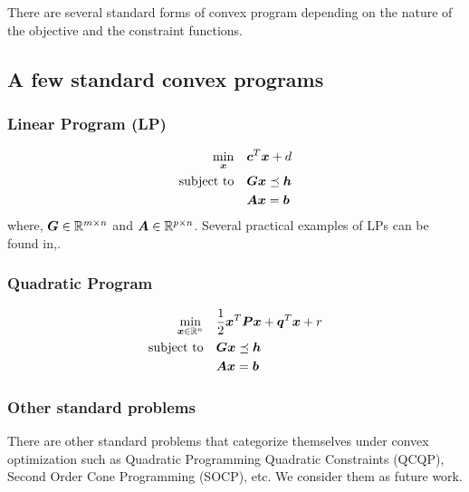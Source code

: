 \documentclass{article} %
\begin{document}
There are several standard forms of convex program depending on the nature of the objective and the constraint functions. 

\subsection{A few standard convex programs}
    \subsubsection{Linear Program (LP)}
        \begin{subequations}\label{eq:LP}
            \begin{align}
                \min_{{\bm{x}}} \quad &{\bm{c}}^T{\bm{x}} + d \\
                \text{subject to} \quad &{\bm{G}}{\bm{x}} \preceq {\bm{h}} \\
                \quad &{\bm{A}}{\bm{x}} = {\bm{b}}
            \end{align}
        \end{subequations}
        where, ${\bm{G}} \in \mathbb{R}^{m \times n}$ and ${\bm{A}} \in \mathbb{R}^{p \times n}$.
    Several practical examples of LPs can be found in,\cite{Boyd_Vandenberghe_2004}.

    \subsubsection{Quadratic Program}
        \begin{subequations}\label{eq:QP}
            \begin{align}
            \min_{{\bm{x}} \in \mathbb{R}^n} \quad &\frac{1}{2}{{\bm{x}}}^T {\bm{P}} {\bm{x}} + {\bm{q}}^T {\bm{x}} + r \\ 
            \text{subject to} \quad & {\bm{G}}{\bm{x}} \preceq {\bm{h}}  \\
            & {\bm{A}}{\bm{x}} = {\bm{b}}
            \end{align}                
        \end{subequations}
    
    \subsubsection{Other standard problems}
    There are other standard problems that categorize themselves under convex optimization such as Quadratic Programming Quadratic Constraints (QCQP), Second Order Cone Programming (SOCP), etc. We consider them as future work.
\end{document}
